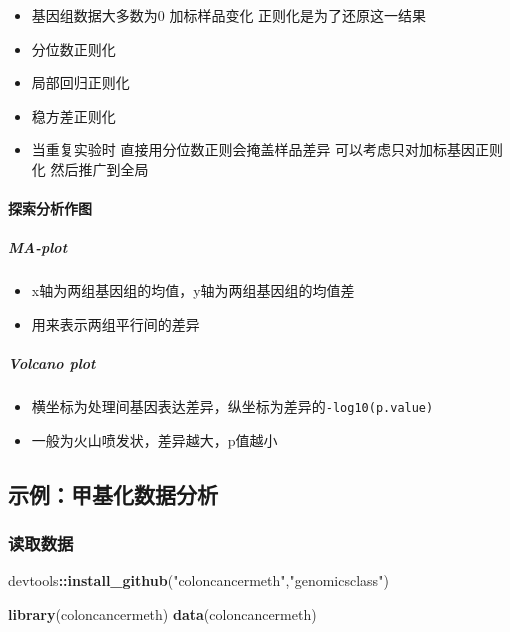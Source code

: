 \documentclass[]{book}
\newenvironment{Shaded}{\begin{snugshade}}{\end{snugshade}}
\newcommand{\KeywordTok}[1]{\textcolor[rgb]{0.13,0.29,0.53}{\textbf{#1}}}
\newcommand{\NormalTok}[1]{#1}
\newcommand{\OperatorTok}[1]{\textcolor[rgb]{0.81,0.36,0.00}{\textbf{#1}}}
\newcommand{\StringTok}[1]{\textcolor[rgb]{0.31,0.60,0.02}{#1}}
\providecommand{\tightlist}{%
  \setlength{\itemsep}{0pt}\setlength{\parskip}{0pt}}
\let\oldparagraph\paragraph
\renewcommand{\paragraph}[1]{\oldparagraph{#1}\mbox{}}
\let\oldsubparagraph\subparagraph
\renewcommand{\subparagraph}[1]{\oldsubparagraph{#1}\mbox{}}
\begin{document}
\begin{itemize}
\tightlist
\item
  基因组数据大多数为0 加标样品变化 正则化是为了还原这一结果
\item
  分位数正则化
\item
  局部回归正则化
\item
  稳方差正则化
\item
  当重复实验时 直接用分位数正则会掩盖样品差异 可以考虑只对加标基因正则化 然后推广到全局
\end{itemize}

\hypertarget{ux63a2ux7d22ux5206ux6790ux4f5cux56fe}{%
\paragraph{探索分析作图}\label{ux63a2ux7d22ux5206ux6790ux4f5cux56fe}}

\hypertarget{ma-plot}{%
\subparagraph{MA-plot}\label{ma-plot}}

\begin{itemize}
\tightlist
\item
  x轴为两组基因组的均值，y轴为两组基因组的均值差
\item
  用来表示两组平行间的差异
\end{itemize}

\hypertarget{volcano-plot}{%
\subparagraph{Volcano plot}\label{volcano-plot}}

\begin{itemize}
\tightlist
\item
  横坐标为处理间基因表达差异，纵坐标为差异的\texttt{-log10(p.value)}
\item
  一般为火山喷发状，差异越大，p值越小
\end{itemize}

\hypertarget{ux793aux4f8bux7532ux57faux5316ux6570ux636eux5206ux6790}{%
\subsection{示例：甲基化数据分析}\label{ux793aux4f8bux7532ux57faux5316ux6570ux636eux5206ux6790}}

\hypertarget{ux8bfbux53d6ux6570ux636e-1}{%
\subsubsection{读取数据}\label{ux8bfbux53d6ux6570ux636e-1}}

\begin{Shaded}
\begin{Highlighting}[]
\NormalTok{devtools}\OperatorTok{::}\KeywordTok{install_github}\NormalTok{(}\StringTok{"coloncancermeth"}\NormalTok{,}\StringTok{"genomicsclass"}\NormalTok{)}

\KeywordTok{library}\NormalTok{(coloncancermeth)}
\KeywordTok{data}\NormalTok{(coloncancermeth)}
\end{Highlighting}
\end{Shaded}
\end{document}

